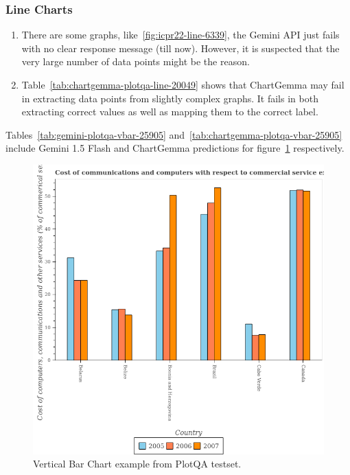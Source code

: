 \documentclass[
	letterpaper, %
]{jdf}
\begin{document}
       \subsubsection{Line Charts}\label{sssect:line-errors}
       \begin{enumerate}
     \item There are some graphs, like~\ref{fig:icpr22-line-6339}, the Gemini API just fails with no clear response message (till now).
       However, it is suspected that the very large number of data points might be the reason.
     \item Table~\ref{tab:chartgemma-plotqa-line-20049} shows that ChartGemma may fail in extracting data points from slightly complex graphs.
       It fails in both extracting correct values as well as mapping them to the correct label.
              \end{enumerate}
       Tables~\ref{tab:gemini-plotqa-vbar-25905} and~\ref{tab:chartgemma-plotqa-vbar-25905} include Gemini 1.5 Flash and ChartGemma predictions for figure~\ref{fig:plotqa-vbar-25905} respectively.
\begin{figure}
   \includegraphics{test-sample/plotqa/images/vertical-bar/25905.png}
   \caption{Vertical Bar Chart example from PlotQA testset.}\label{fig:plotqa-vbar-25905}
   \end{figure}


\end{document}
